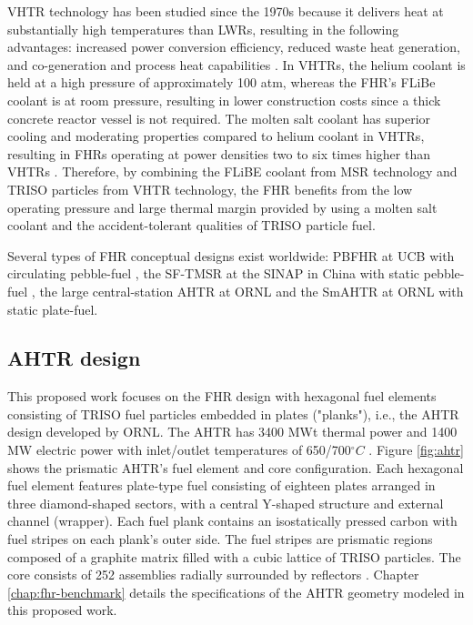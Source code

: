 \gls{VHTR} technology has been studied since the 1970s because it delivers 
heat at substantially high temperatures than \glspl{LWR}, resulting in 
the following advantages: increased power conversion efficiency, reduced 
waste heat generation, and co-generation and process heat capabilities 
\cite{scarlat_design_2014}. 
In \glspl{VHTR}, the helium coolant is held at a high pressure of approximately 
100 atm, whereas the \gls{FHR}'s FLiBe coolant is at room pressure, resulting in lower 
construction costs since a thick concrete reactor vessel is not required.
The molten salt coolant has superior cooling and moderating properties compared 
to helium coolant in \glspl{VHTR}, resulting in \glspl{FHR} operating at 
power densities two to six times higher than  \glspl{VHTR} 
\cite{scarlat_design_2014,forsberg_fluoride-salt-cooled_2012}.
Therefore, by combining the FLiBE coolant from \gls{MSR} technology and 
\gls{TRISO} particles from \gls{VHTR} technology, the \gls{FHR} benefits from 
the low operating pressure and large thermal margin provided by using a molten 
salt coolant and the accident-tolerant qualities of \gls{TRISO} particle fuel. 

Several types of \gls{FHR} conceptual designs exist worldwide: \gls{PBFHR} at 
UCB with circulating pebble-fuel 
\cite{scarlat_current_2014,krumwiede_three-dimensional_2013}, the \gls{SF-TMSR} 
at the \gls{SINAP} in China with static pebble-fuel \cite{liu_preliminary_2016}, 
the large central-station \gls{AHTR} at \gls{ORNL} \cite{holcomb_core_2011, varma_ahtr_2012} and 
the \gls{SmAHTR} at ORNL \cite{greene_pre-conceptual_2010} with static plate-fuel. 

\subsection{AHTR design}
This proposed work focuses on the \gls{FHR} design with hexagonal fuel elements 
consisting of \gls{TRISO} fuel particles embedded in plates ("planks"), i.e., the 
\gls{AHTR} design developed by ORNL. 
The \gls{AHTR} has 3400 MWt thermal power and 1400 MW electric power with
inlet/outlet temperatures of 650/700$^{\circ}C$ \cite{varma_ahtr_2012}.  
Figure \ref{fig:ahtr} shows the prismatic AHTR's fuel element and core 
configuration.  
Each hexagonal fuel element features plate-type fuel consisting of eighteen plates 
arranged in three diamond-shaped sectors, with a central Y-shaped structure 
and external channel (wrapper).
Each fuel plank contains an isostatically pressed carbon with fuel stripes 
on each plank's outer side.
The fuel stripes are prismatic regions composed of a graphite matrix filled with 
a cubic lattice of \gls{TRISO} particles. 
The core consists of 252 assemblies radially surrounded by reflectors
\cite{ramey_monte_2018}. 
Chapter \ref{chap:fhr-benchmark} details the specifications of the AHTR geometry
modeled in this proposed work.

